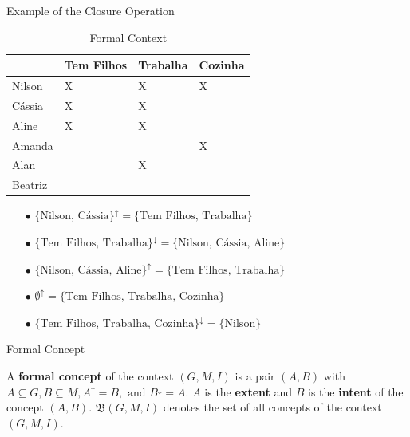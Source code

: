 \documentclass[pdf,xcolor=table]{beamer}
\begin{document}
\begin{frame}[t]{Example of the Closure Operation}
    \begin{table}[]
        \tiny
        \centering
        \caption{Formal Context}
        \begin{tabular}{@{}|l|l|l|l|@{}} \hline
                    & Tem Filhos & Trabalha & Cozinha \\\hline
            Nilson  & X          & X        & X       \\\hline
            Cássia  & X          & X        &         \\\hline
            Aline   & X          & X        &         \\\hline
            Amanda  &            &          & X       \\\hline
            Alan    &            & X        &         \\\hline
            Beatriz &            &          &         \\\hline
        \end{tabular}
    \end{table}
    \begin{itemize}
        \item[$\bullet$] $\{\text{Nilson, Cássia}\}^\uparrow = \{\text{Tem Filhos, Trabalha}\}$
        \item[$\bullet$] $\{\text{Tem Filhos, Trabalha}\}^\downarrow = \{\text{Nilson, Cássia, Aline}\}$
        \item[$\bullet$] $\{\text{Nilson, Cássia, Aline}\}^\uparrow = \{\text{Tem Filhos, Trabalha}\}$
        \item[$\bullet$] $\emptyset^\uparrow = \{\text{Tem Filhos, Trabalha, Cozinha}\}$
        \item[$\bullet$] $\{\text{Tem Filhos, Trabalha, Cozinha}\}^\downarrow = \{\text{Nilson}\}$
    \end{itemize}
\end{frame}

\begin{frame}[t]{Formal Concept}
    \begin{definition}
        A \textbf{formal concept} of the context $(G, M, I)$ is a pair $(A, B)$ with $A \subseteq G, B \subseteq M, A^\uparrow = B, \text{ and } B^\downarrow = A$. $A$ is the \textbf{extent} and $B$ is the \textbf{intent} of the concept $(A, B)$.
        $\mathfrak{B}(G, M, I)$ denotes the set of all concepts of the context $(G, M, I)$.
    \end{definition}
\end{frame}
\end{document}
